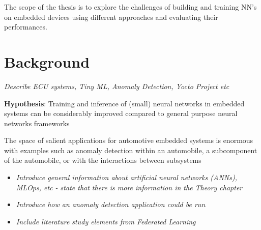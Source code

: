 The scope of the thesis is to explore the challenges of building and training NN's on embedded devices using different approaches and evaluating their performances.






\chapter{Background}
\textit{Describe ECU systems, Tiny ML, Anomaly Detection, Yocto Project etc}

\noindent \textbf{Hypothesis}: Training and inference of (small) neural networks in embedded systems can be considerably improved compared to general purpose neural networks frameworks

The space of salient applications for automotive embedded systems is enormous with examples such as anomaly detection within an automobile, a subcomponent of the automobile, or with the interactions between subsystems

\begin{itemize}
	\item \textit{Introduce general information about artificial neural networks (ANNs), MLOps, etc - state that there is more information in the Theory chapter}
	\item \textit{Introduce how an anomaly detection application could be run}
	\item \textit{Include literature study elements from Federated Learning}
\end{itemize}

